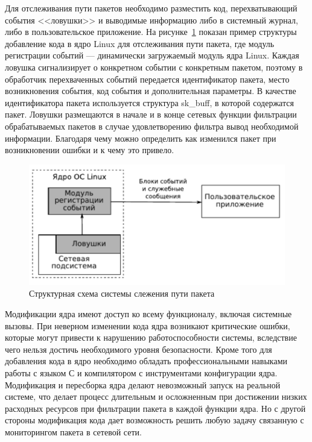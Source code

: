 Для отслеживания пути пакетов необходимо разместить код, перехватывающий события <<ловушки>> и выводимые информацию либо в системный журнал, либо в пользовательское приложение. 
На рисунке~\ref{img:ex_mod} показан пример структуры добавление кода в ядро Linux для отслеживания пути пакета, где модуль регистрации событий --- динамически загружаемый модуль ядра Linux.
Каждая ловушка сигнализирует о конкретном событии с конкретным пакетом, поэтому в обработчик перехваченных событий передается идентификатор пакета, место возникновения события, код события и дополнительная параметры. В качестве идентификатора пакета используется структура sk\_buff, в которой содержатся пакет. Ловушки размещаются в начале и в конце сетевых функции фильтрации обрабатываемых пакетов в случае удовлетворению фильтра вывод необходимой информации. Благодаря чему можно определить как изменился пакет при возникновении ошибки и к чему это привело.~\cite{ip_monitoring}

\begin{figure}[h!]
	\centering
	\includegraphics[height=0.3\textheight]{img/ex_mod} %
	\caption{Структурная схема системы слежения пути пакета}
	\label{img:ex_mod}
\end{figure}

Модификации ядра имеют доступ ко всему функционалу, включая системные вызовы.
При неверном изменении кода ядра возникают критические ошибки, которые могут привести к нарушению работоспособности системы, вследствие чего нельзя достичь необходимого уровня безопасности.
Кроме того для добавления кода в ядро необходимо обладать профессиональными навыками работы с языком С и компилятором с инструментами конфигурации ядра.
Модификация и пересборка ядра делают невозможный запуск на реальной системе, что делает процесс длительным и осложненным при достижении низких расходных ресурсов при фильтрации пакета в каждой функции ядра.
Но с другой стороны модификация кода дает возможность решить любую задачу связанную с мониторингом пакета в сетевой сети. 

